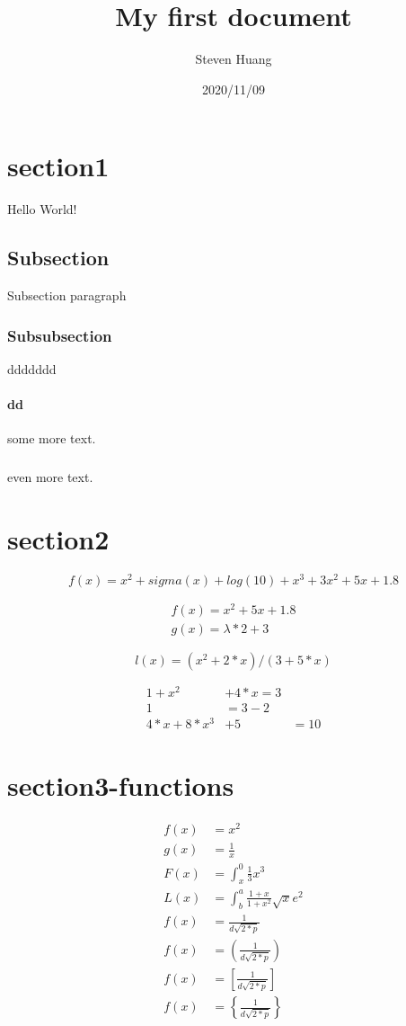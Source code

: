 \documentclass{article}
\title{ My first document}
\date{2020/11/09}
\author{Steven Huang}
\begin{document}
\maketitle
\newpage
{}

\section{section1}
Hello World!

\subsection{Subsection}
Subsection paragraph

\subsubsection{Subsubsection}
ddddddd

\paragraph{dd}
some more text.
\subparagraph{}
even more text.

\section{section2}
\begin{equation}
f(x)=x^2 + sigma(x) + log(10) + x^3 + 3x^2 + 5x + 1.8
\end{equation}

\begin{align}
f(x)=x^2 + 5x + 1.8\\
g(x)=\lambda*2+3
\end{align}

\begin{equation}
l(x)=(x^2 + 2*x)/(3+5*x)
\end{equation}

\begin{align}
  1 + x^2 & + 4*x= 3\\
  1 &= 3 - 2\\
  4*x+8*x^3 &+5&=10
\end{align}

\section{section3-functions}
\begin{align}
f(x)  &= x^2 \\
g(x) &= \frac{1}{x}\\
F(x) &= \int^0_x \frac{1}{3}x^3\\
L(x) &= \int^a_b \frac{1+x}{1+x^2}\sqrt{x}e^2\\
f(x) &= \frac{1}{d \sqrt{2*p}}\\
f(x) &= \left( \frac{1}{d \sqrt{2*p}} \right)\\
f(x) &= \left[ \frac{1}{d \sqrt{2*p}} \right]\\
f(x) &= \left\{ \frac{1}{d \sqrt{2*p}} \right\}
\end{align}
\end{document}
